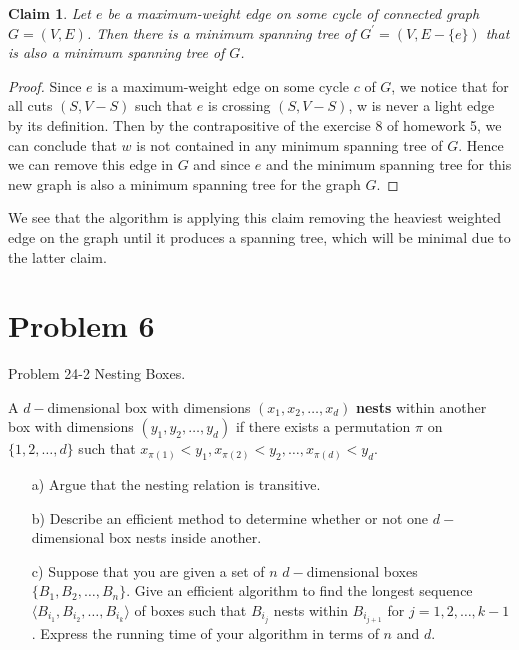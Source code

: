\documentclass[a4paper, 11pt]{article}
\newtheorem{claim}[theorem]{Claim}
\begin{document}
\begin{itemize}
	\begin{claim}
		Let $e$ be a maximum-weight edge on some cycle of connected graph $G = (V, E)$. Then there is a minimum spanning tree of $G^{'} = (V, E - \{e\})$ that is also a minimum spanning tree of $G$.
	\end{claim}

	\begin{proof}
		Since $e$ is a maximum-weight edge on some cycle $c$ of $G$, we notice that for all cuts $(S, V - S)$ such that $e$ is crossing $(S, V - S)$, w is never a light edge by its definition. Then by the contrapositive of the exercise 8 of homework 5, we can conclude that $w$ is not contained in any minimum spanning tree of $G$. Hence we can remove this edge in $G$ and since $e$ and the minimum spanning tree for this new graph is also a minimum spanning tree for the graph $G$.
	\end{proof}

	We see that the algorithm is applying this claim removing the heaviest weighted edge on the graph until it produces a spanning tree, which will be minimal due to the latter claim. 
\end{itemize}

\section*{Problem 6}

Problem 24-2 Nesting Boxes.

A $d-$dimensional box with dimensions $(x_1, x_2, \dots, x_d)$ \textbf{nests} within another box with dimensions $(y_1, y_2, \dots, y_d)$ if there exists a permutation $\pi$ on $\{1, 2, \dots, d \}$ such that $x_{\pi(1)} < y_1, x_{\pi(2)} < y_2, \dots, x_{\pi(d)} < y_d$.

\begin{itemize}
	\item [a)] Argue that the nesting relation is transitive.
	\item [b)] Describe an efficient method to determine whether or not one $d-$dimensional box nests inside another.
	\item [c)] Suppose that you are given a set of $n$ $d-$dimensional boxes $\{B_1, B_2, \dots, B_n\}$. Give an efficient algorithm to find the longest sequence $\langle B_{i_1}, B_{i_2}, \dots, B_{i_k} \rangle$ of boxes such that $B_{i_j}$	nests within $B_{i_{j + 1}}$ for $j = 1, 2, \dots, k - 1$. Express the running time of your algorithm in terms of $n$ and $d$.
\end{itemize}
\end{document}
